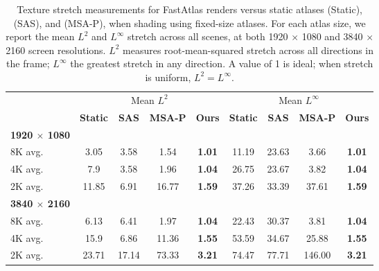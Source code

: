 \begin{table}
\scriptsize
\setlength{\tabcolsep}{2pt}
\centering
\begin{tabular}{l|cccc|cccc}
  & \multicolumn{4}{c|}{Mean $L^2$} & \multicolumn{4}{c}{Mean $L^\infty$} \\
  & \textbf{Static} & \textbf{SAS} & \textbf{MSA-P} & \textbf{Ours} & \textbf{Static} & \textbf{SAS} & \textbf{MSA-P} & \textbf{Ours}\\
\hline
\textbf{1920 $\times$ 1080} & & & & & & & & \\
8K avg. 	& 3.05 & 3.58 & 1.54 & \textbf{1.01} & 11.19 & 23.63 & 3.66 & \textbf{1.01} \\
4K avg.	& 7.9 & 3.58 & 1.96 & \textbf{1.04} & 26.75 & 23.67 & 3.82 & \textbf{1.04} \\
2K avg.	& 11.85 & 6.91 & 16.77 & \textbf{1.59} & 37.26 & 33.39 & 37.61 & \textbf{1.59} \\
\hline
\textbf{3840 $\times$ 2160} & & & & & & & & \\
8K avg. 	& 6.13 & 6.41 & 1.97 & \textbf{1.04} & 22.43 & 30.37 & 3.81 & \textbf{1.04} \\
4K avg.	& 15.9 & 6.86 & 11.36 & \textbf{1.55} & 53.59 & 34.67 & 25.88 & \textbf{1.55} \\
2K avg.	& 23.71 & 17.14 & 73.33 & \textbf{3.21} & 74.47 & 77.71 & 146.00 & \textbf{3.21}
\end{tabular}
\caption{Texture stretch  \cite{sander2001texture} measurements for FastAtlas renders versus static atlases (Static), \cite{mueller2018shading} (SAS), and \cite{Neff2022MSA} (MSA-P), when shading using fixed-size atlases. For each atlas size, we report the mean $L^2$ and $L^\infty$ stretch across all scenes, at both 1920 $\times$ 1080 and 3840 $\times$ 2160 screen resolutions. $L^2$ measures root-mean-squared stretch across all directions in the frame; $L^{\infty}$ the greatest stretch in any direction. 
A value of 1 is ideal; when stretch is uniform, $L^2=L^{\infty}$.}
\label{tab:stretch_fixed_atlas}
\vspace{-3mm}
\end{table}
